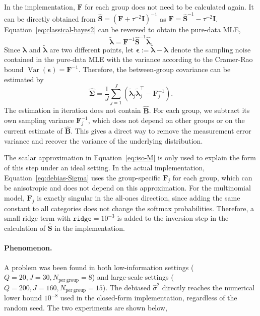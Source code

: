 In the implementation, $\mathbf{F}$ for each group does not need to be calculated again. It can be directly obtained from $\hat{\mathbf{S}}=\left(\mathbf{F}+\tau^{-2}\mathbf{I}\right)^{-1}$ as $\mathbf{F}=\hat{\mathbf{S}}^{-1}-\tau^{-2}\mathbf{I}$. Equation~\ref{eq:classical-bayes2} can be reversed to obtain the pure-data MLE,
\begin{equation}
\tilde{\bm{\lambda}}=\mathbf{F}^{-1}\hat{\mathbf{S}}^{-1}\hat{\bm{\lambda}}.
\label{eq:pure-data-lambda}
\end{equation}
Since $\bm{\lambda}$ and $\tilde{\bm{\lambda}}$ are two different points, let $\bm{\epsilon}:=\tilde{\bm{\lambda}}-\bm{\lambda}$ denote the sampling noise contained in the pure-data MLE with the variance according to the Cramer-Rao bound $\operatorname{Var}\left(\bm{\epsilon}\right)=\mathbf{F}^{-1}$. Therefore, the between-group covariance can be estimated by
\begin{equation}
\hat{\bm{\Sigma}}=\frac{1}{J}\sum_{j=1}^{J}\left(\tilde{\bm{\lambda}}_j\tilde{\bm{\lambda}}_j^{\top}-\mathbf{F}_j^{-1}\right).
\label{eq:debias-Sigma}
\end{equation}
The estimation in iteration does not contain $\hat{\mathbf{B}}$. For each group, we subtract its own sampling variance $\mathbf{F}_j^{-1}$, which does not depend on other groups or on the current estimate of $\hat{\mathbf{B}}$. This gives a direct way to remove the measurement error variance and recover the variance of the underlying distribution.

The scalar approximation in Equation~\eqref{eq:iso-M} is only used to explain the form of this step under an ideal setting. In the actual implementation, Equation~\eqref{eq:debias-Sigma} uses the group-specific $\mathbf{F}_j$ for each group, which can be anisotropic and does not depend on this approximation. For the multinomial model, $\mathbf{F}_j$ is exactly singular in the all-ones direction, since adding the same constant to all categories does not change the softmax probabilities. Therefore, a small ridge term with $\texttt{ridge}=10^{-3}$ is added to the inversion step in the calculation of $\hat{\mathbf{S}}$ in the implementation.

\paragraph*{Phenomenon.} A problem was been found in both low-information settings ($Q=20,J=30,N_{\mathrm{per\ group}}=8$) and large-scale settings ($Q=200,J=160,N_{\mathrm{per\ group}}=15$). The debiased $\hat{\sigma}^{2}$ directly reaches the numerical lower bound $10^{-8}$ used in the closed-form implementation, regardless of the random seed. The two experiments are shown below,

